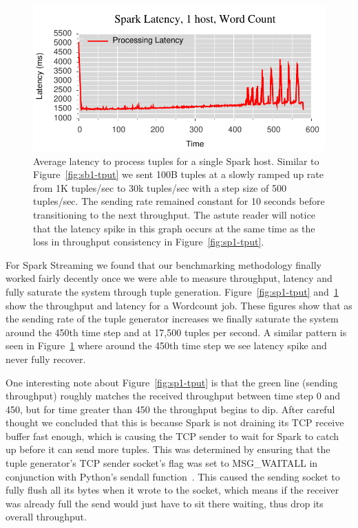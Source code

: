 \begin{figure}[t]
\centering
\includegraphics[width=1\linewidth]{figures/sp1_latency.pdf}
\caption{Average latency to process tuples for a single Spark host. Similar to
Figure~\ref{fig:sb1-tput} we sent 100B tuples at a slowly ramped up rate from 1K
tuples/sec to 30k tuples/sec with a step size of 500 tuples/sec. The sending
rate remained constant for 10 seconds before transitioning to the next
throughput. The astute reader will notice that the latency spike in this graph
occurs at the same time as the loss in throughput consistency in
Figure~\ref{fig:sp1-tput}.}
\label{fig:sp1-latency}
\end{figure}

For Spark Streaming we found that our benchmarking methodology finally worked
fairly decently once we were able to measure throughput, latency and fully
saturate the system through tuple generation. Figure~\ref{fig:sp1-tput}
and~\ref{fig:sp1-latency} show the throughput and latency for a Wordcount job. These
figures show that as the sending rate of the tuple generator increases we
finally saturate the system around the 450th time step and at 17,500 tuples per
second. A similar pattern is seen in Figure~\ref{fig:sp1-latency} where around
the 450th time step we see latency spike and never fully recover. 

One interesting note about Figure~\ref{fig:sp1-tput} is that the green line
(sending throughput) roughly matches the received throughput between time step
0 and 450, but for time greater than 450 the throughput begins to dip. After
careful thought we concluded that this is because Spark is not draining its TCP
receive buffer fast enough, which is causing the TCP sender to wait for Spark
to catch up before it can send more tuples. This was determined by ensuring
that the tuple generator's TCP sender socket's flag was set to MSG\_WAITALL in
conjunction with Python's sendall function~\cite{python-sockets}. This caused
the sending socket to fully flush all its bytes when it wrote to the socket,
which means if the receiver was already full the send would just have to sit
there waiting, thus drop its overall throughput.


